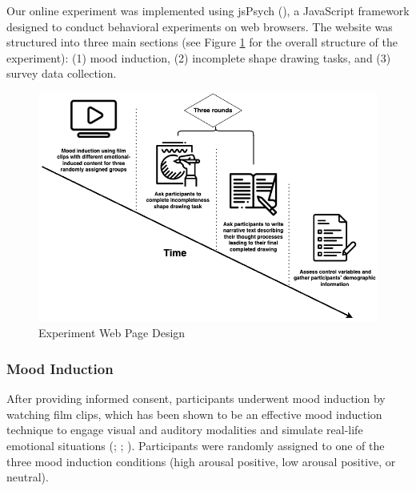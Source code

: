 \documentclass[../MA_Thesis.tex]{subfiles}
\begin{document}
Our online experiment was implemented using jsPsych (\cite{leeuw_jspsych_2023}), a JavaScript framework designed to conduct behavioral experiments on web browsers. The website was structured into three main sections (see Figure \ref{fig: Experiment Web Page Design} for the overall structure of the experiment): (1) mood induction, (2) incomplete shape drawing tasks, and (3) survey data collection.

\begin{figure}
    \centering
    \includegraphics[width=0.7\linewidth, keepaspectratio]{drawio/Experiment Timeline.png}
    \caption{Experiment Web Page Design}
    \label{fig: Experiment Web Page Design}
\end{figure}

\subsubsection*{Mood Induction}
After providing informed consent, participants underwent mood induction by watching film clips, which has been shown to be an effective mood induction technique to engage visual and auditory modalities and simulate real-life emotional situations (\cite{coan_handbook_2007}; \cite{fernandez-aguilar_how_2019}; \cite{siedlecka_experimental_2019}). Participants were randomly assigned to one of the three mood induction conditions (high arousal positive, low arousal positive, or neutral). 
\end{document}
